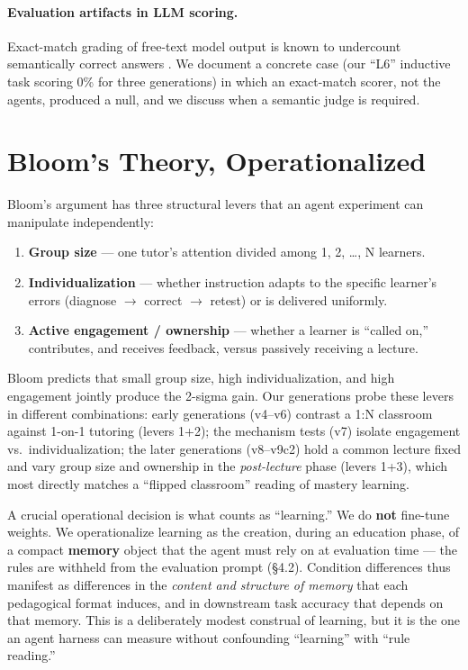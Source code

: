 \documentclass[11pt]{article}
\begin{document}
\paragraph{Evaluation artifacts in LLM scoring.}
Exact-match grading of free-text model output is known to undercount semantically
correct answers \citep{rajpurkar2016}.  We document a concrete case (our ``L6''
inductive task scoring 0\% for three generations) in which an exact-match scorer, not
the agents, produced a null, and we discuss when a semantic judge is required.

\section{Bloom's Theory, Operationalized}

Bloom's argument has three structural levers that an agent experiment can manipulate
independently:
\begin{enumerate}
  \item \textbf{Group size} --- one tutor's attention divided among 1, 2, \ldots, N
    learners.
  \item \textbf{Individualization} --- whether instruction adapts to the specific
    learner's errors (diagnose $\to$ correct $\to$ retest) or is delivered uniformly.
  \item \textbf{Active engagement / ownership} --- whether a learner is ``called on,''
    contributes, and receives feedback, versus passively receiving a lecture.
\end{enumerate}

Bloom predicts that small group size, high individualization, and high engagement
jointly produce the 2-sigma gain.  Our generations probe these levers in different
combinations: early generations (v4--v6) contrast a 1:N classroom against 1-on-1
tutoring (levers 1+2); the mechanism tests (v7) isolate engagement vs.\
individualization; the later generations (v8--v9c2) hold a common lecture fixed and
vary group size and ownership in the \emph{post-lecture} phase (levers 1+3), which
most directly matches a ``flipped classroom'' reading of mastery learning.

A crucial operational decision is what counts as ``learning.''  We do \textbf{not}
fine-tune weights.  We operationalize learning as the creation, during an education
phase, of a compact \textbf{memory} object that the agent must rely on at evaluation
time --- the rules are withheld from the evaluation prompt (\S4.2).  Condition
differences thus manifest as differences in the \emph{content and structure of memory}
that each pedagogical format induces, and in downstream task accuracy that depends on
that memory.  This is a deliberately modest construal of learning, but it is the one
an agent harness can measure without confounding ``learning'' with ``rule reading.''
\end{document}
